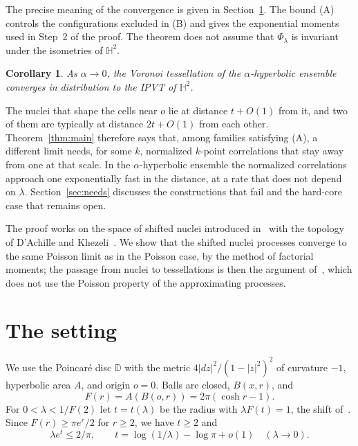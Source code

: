 \documentclass[11pt]{amsart}
\newtheorem{corollary}[theorem]{Corollary}
\theoremstyle{definition}
\theoremstyle{remark}
\newcommand{\HH}{\mathbb{H}}
\newcommand{\D}{\mathbb{D}}
\newcommand{\area}{A}
\begin{document}
The precise meaning of the convergence is given in Section~\ref{sec:setting}. The bound (A) controls the
configurations excluded in (B) and gives the exponential moments used in Step~2 of the proof. The theorem does not
assume that $\Phi_\lambda$ is invariant under the
isometries of $\HH^2$.

\begin{corollary}\label{cor:ensemble}
As $\alpha\to0$, the Voronoi tessellation of the $\alpha$-hyperbolic ensemble converges in distribution to the IPVT of
$\HH^2$.
\end{corollary}

The nuclei that shape the cells near $o$ lie at distance $t+O(1)$ from it, and two of them are typically at distance
$2t+O(1)$ from each other. Theorem~\ref{thm:main} therefore says that, among families satisfying (A), a different
limit needs, for some $k$, normalized $k$-point correlations that stay away from one at that scale. In the
$\alpha$-hyperbolic ensemble the normalized correlations approach one exponentially fast in the distance, at a rate
that does not depend on $\lambda$. Section~\ref{sec:needs} discusses the constructions that fail and the hard-core case
that remains open.

The proof works on the space of shifted nuclei introduced in~\cite{DCE26,FMW23} with the topology of
D'Achille and Khezeli~\cite[Section~3.1]{DK26}. We show that the shifted nuclei processes converge to the same Poisson
limit as in the Poisson case, by the method of factorial moments; the passage from nuclei to tessellations is then
the argument of~\cite[Proposition~3.3]{DK26}, which does not use the Poisson property of the approximating processes.

\section{The setting}\label{sec:setting}

We use the Poincar\'e disc $\D$ with the metric $4|dz|^2/(1-|z|^2)^2$ of curvature $-1$, hyperbolic area $\area$, and
origin $o=0$. Balls are closed, $B(x,r)$, and
\[
  F(r)=\area(B(o,r))=2\pi(\cosh r-1).
\]
For $0<\lambda<1/F(2)$ let $t=t(\lambda)$ be the radius with $\lambda F(t)=1$, the shift of~\cite[(3.1)]{DK26}.
Since $F(r)\ge \pi e^r/2$ for $r\ge2$, we have $t\ge2$ and
\begin{equation}\label{eq:t}
  \lambda e^{t}\le 2/\pi,\qquad t=\log(1/\lambda)-\log\pi+o(1)\quad(\lambda\to0).
\end{equation}
\end{document}
